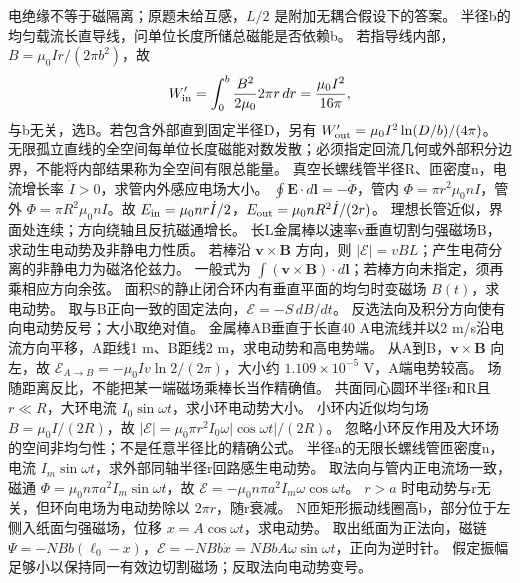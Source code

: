 \crosscheck 电绝缘不等于磁隔离；原题未给互感，$L/2$ 是附加无耦合假设下的答案。
\problemtext 半径b的均匀载流长直导线，问单位长度所储总磁能是否依赖b。
\workings 若指导线内部，$B=\mu_0Ir/(2\pi b^2)$，故
\[
W'_{\rm in}=\int_0^b\frac{B^2}{2\mu_0}2\pi r\,dr=\frac{\mu_0 I^2}{16\pi},
\]
与b无关，选B。若包含外部直到固定半径D，另有 $W'_{\rm out}=\mu_0 I^2\ln(D/b)/(4\pi)$。
\crosscheck 无限孤立直线的全空间每单位长度磁能对数发散；必须指定回流几何或外部积分边界，不能将内部结果称为全空间有限总能量。
\problemtext 真空长螺线管半径R、匝密度n，电流增长率 $\dot I>0$，求管内外感应电场大小。
\workings $\oint\bm E\cdot d\bm l=-\dot\Phi$，管内 $\Phi=\pi r^2\mu_0nI$，管外 $\Phi=\pi R^2\mu_0nI$。故 $E_{\rm in}=\mu_0nr\dot I/2$，$E_{\rm out}=\mu_0nR^2\dot I/(2r)$。
\crosscheck 理想长管近似，界面处连续；方向绕轴且反抗磁通增长。
\problemtext 长L金属棒以速率v垂直切割匀强磁场B，求动生电动势及非静电力性质。
\workings 若棒沿 $\bm v\times\bm B$ 方向，则 $|\mathcal E|=vBL$；产生电荷分离的非静电力为磁洛伦兹力。
\crosscheck 一般式为 $\int(\bm v\times\bm B)\cdot d\bm l$；若棒方向未指定，须再乘相应方向余弦。
\problemtext 面积S的静止闭合环内有垂直平面的均匀时变磁场 $B(t)$，求电动势。
\workings 取与B正向一致的固定法向，$\mathcal E=-S\,dB/dt$。
\crosscheck 反选法向及积分方向使有向电动势反号；大小取绝对值。
\problemtext 金属棒AB垂直于长直40 A电流线并以2 m/s沿电流方向平移，A距线1 m、B距线2 m，求电动势和高电势端。
\workings 从A到B，$\bm v\times\bm B$ 向左，故 $\mathcal E_{A\to B}=-\mu_0Iv\ln2/(2\pi)$，大小约 $1.109\times10^{-5}$ V，A端电势较高。
\crosscheck 场随距离反比，不能把某一端磁场乘棒长当作精确值。
\problemtext 共面同心圆环半径r和R且 $r\ll R$，大环电流 $I_0\sin\omega t$，求小环电动势大小。
\workings 小环内近似均匀场 $B=\mu_0I/(2R)$，故 $|\mathcal E|=\mu_0\pi r^2 I_0\omega|\cos\omega t|/(2R)$。
\crosscheck 忽略小环反作用及大环场的空间非均匀性；不是任意半径比的精确公式。
\problemtext 半径a的无限长螺线管匝密度n，电流 $I_m\sin\omega t$，求外部同轴半径r回路感生电动势。
\workings 取法向与管内正电流场一致，磁通 $\Phi=\mu_0n\pi a^2I_m\sin\omega t$，故 $\mathcal E=-\mu_0n\pi a^2I_m\omega\cos\omega t$。
\crosscheck $r>a$ 时电动势与r无关，但环向电场为电动势除以 $2\pi r$，随r衰减。
\problemtext N匝矩形振动线圈高b，部分位于左侧入纸面匀强磁场，位移 $x=A\cos\omega t$，求电动势。
\workings 取出纸面为正法向，磁链 $\Psi=-NBb(\ell_0-x)$，$\mathcal E=-NBb\dot x=NBbA\omega\sin\omega t$，正向为逆时针。
\crosscheck 假定振幅足够小以保持同一有效边切割磁场；反取法向电动势变号。

